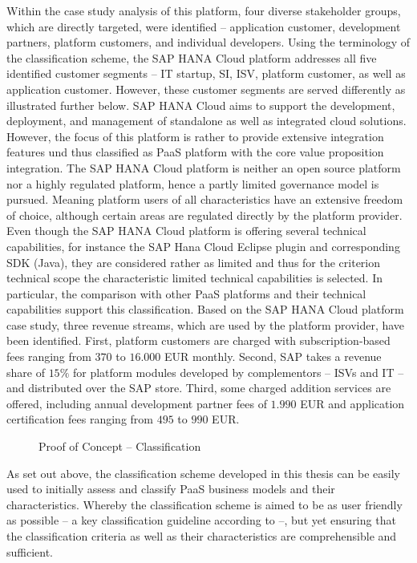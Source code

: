 Within the case study analysis of this platform, four diverse stakeholder groups, which are directly targeted, were identified -- application customer, development partners, platform customers, and individual developers. Using the terminology of the classification scheme, the SAP HANA Cloud platform addresses all five identified customer segments -- \ac{IT} startup, \ac{SI}, \ac{ISV}, platform customer, as well as application customer. However, these customer segments are served differently as illustrated further below. SAP HANA Cloud aims to support the development, deployment, and management of standalone as well as integrated cloud solutions. However, the focus of this platform is rather to provide extensive integration features und thus classified as \ac{PaaS} platform with the core value proposition integration. The SAP HANA Cloud platform is neither an open source platform nor a highly regulated platform, hence a partly limited governance model is pursued. Meaning platform users of all characteristics have an extensive freedom of choice, although certain areas are regulated directly by the platform provider. Even though the SAP HANA Cloud platform is offering several technical capabilities, for instance the SAP Hana Cloud Eclipse plugin and corresponding \ac{SDK} (Java), they are considered rather as limited and thus for the criterion technical scope the characteristic limited technical capabilities is selected. In particular, the comparison with other \ac{PaaS} platforms and their technical capabilities support this classification. Based on the SAP HANA Cloud platform case study, three revenue streams, which are used by the platform provider, have been identified. First, platform customers are charged with subscription-based fees ranging from $370$ to $16.000$ \ac{EUR} monthly. Second, SAP takes a revenue share of $15\%$ for platform modules developed by complementors -- \acp{ISV} and \ac{IT} -- and distributed over the SAP store. Third, some charged addition services are offered, including annual development partner fees of $1.990$ \ac{EUR} and application certification fees ranging from $495$ to $990$ \ac{EUR}.

\begin{figure}[tb]
	\centering
	
	\caption{Proof of Concept -- Classification}
	\label{fig:cs:sap}
\end{figure}

As set out above, the classification scheme developed in this thesis can be easily used to initially assess and classify \ac{PaaS} business models and their characteristics. Whereby the classification scheme is aimed to be as user friendly as possible -- a key classification guideline according to \citet[p. 41]{Fettke2003} --, but yet ensuring that the classification criteria as well as their characteristics are comprehensible and sufficient.

